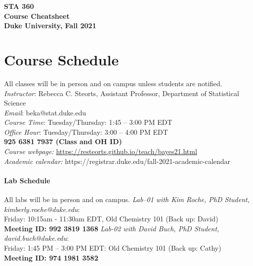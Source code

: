 \documentclass[11pt]{article}
\date{}
\begin{document}
\begin{center}
{\Large\bf STA 360\\ Course Cheatsheet} \\

{\Large\bf Duke University, Fall 2021} \\
\end{center}


\section{Course Schedule}
All classes will be in person and on campus unless students are notified. 
\emph{Instructor}: Rebecca C. Steorts,  Assistant Professor,  Department of Statistical Science\\
\emph{Email}: beka@stat.duke.edu\\
\emph{Course Time}: Tuesday/Thursday: 1:45 -- 3:00 PM EDT \\
\emph{Office Hour}: Tuesday/Thursday: 3:00 -- 4:00 PM EDT \\
\textbf{925 6381 7937 (Class and OH ID)}\\
\emph{Course webpage:} \url{https://resteorts.github.io/teach/bayes21.html} \\
\emph{Academic calendar:} https://registrar.duke.edu/fall-2021-academic-calendar


\paragraph{Lab Schedule}
All labs will be in person and on campus. 
\emph{Lab--01 with Kim Roche, PhD Student, kimberly.roche@duke.edu}: \\Friday: 10:15am - 11:30am EDT, Old Chemistry 101 (Back up: David) \\
\textbf{Meeting ID: 992 3819 1368}
\emph{Lab-02 with David Buch, PhD Student, david.buch@duke.edu}: \\Friday: 1:45 PM -- 3:00 PM EDT: Old Chemistry 101 (Back up: Cathy) \\
\textbf{Meeting ID: 974 1981 3582}\\
\end{document}
